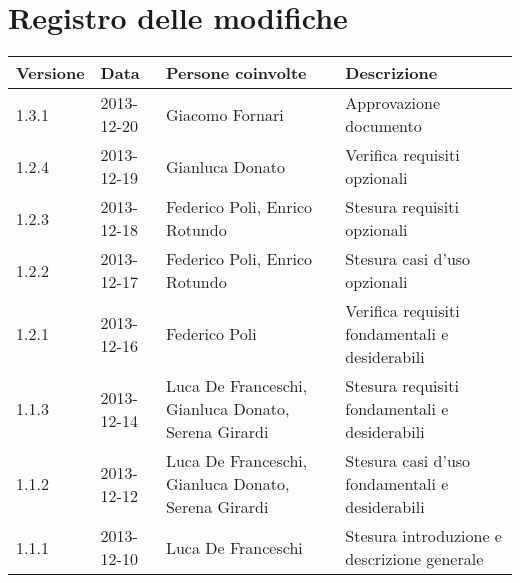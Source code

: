 \section*{Registro delle modifiche}

\small{
\begin{tabularx}{\textwidth}{|X|X|X|X|}
 \hline \textbf{Versione} & \textbf{Data} & \textbf{Persone coinvolte} & \textbf{Descrizione} \\


\hline 1.3.1 & 2013-12-20 & Giacomo Fornari & Approvazione documento \\

\hline 1.2.4 & 2013-12-19 & Gianluca Donato & Verifica requisiti opzionali \\

\hline 1.2.3 & 2013-12-18 & Federico Poli, Enrico Rotundo  & Stesura requisiti opzionali \\ 
 
 \hline 1.2.2 & 2013-12-17 & Federico Poli, Enrico Rotundo & Stesura casi d'uso opzionali \\

 \hline 1.2.1 & 2013-12-16 & Federico Poli & Verifica requisiti fondamentali e desiderabili \\

 \hline 1.1.3 & 2013-12-14 & Luca De Franceschi, Gianluca Donato, Serena Girardi & Stesura requisiti fondamentali e desiderabili \\

 \hline 1.1.2 & 2013-12-12 & Luca De Franceschi, Gianluca Donato, Serena Girardi & Stesura casi d'uso fondamentali e desiderabili \\

 \hline 1.1.1 & 2013-12-10 & Luca De Franceschi & Stesura introduzione e descrizione generale \\
\hline
\end{tabularx}
}
